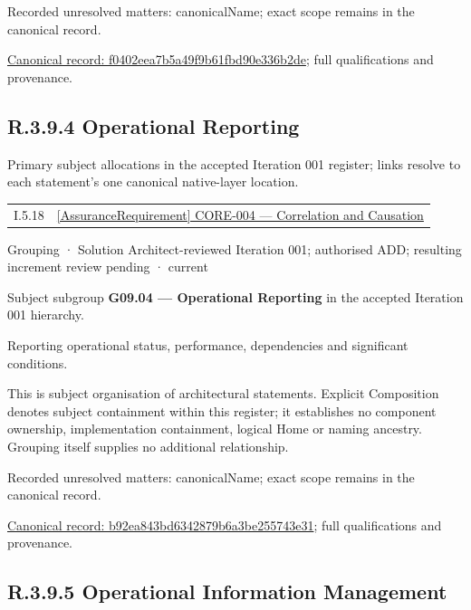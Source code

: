 {\small Recorded unresolved matters: canonicalName; exact scope remains in the canonical record.}\par
{\footnotesize \href{../../../../continuum/grouping/f0402eea7b5a49f9b61fbd90e336b2de.md}{Canonical record: f0402eea7b5a49f9b61fbd90e336b2de}; full qualifications and provenance.}\par
\subsection*{R.3.9.4 Operational Reporting}
\label{navigation:R.3.9.4}

Primary subject allocations in the accepted Iteration 001 register; links resolve to each statement’s one canonical native-layer location.\par
\begin{longtable}{p{.22\linewidth}p{.73\linewidth}}
I.5.18 & \hyperref[element:f2e504e7d6374e41a81303265adda6de]{[AssuranceRequirement] CORE-004 — Correlation and Causation} \\
\end{longtable}
\label{element:b92ea843bd6342879b6a3be255743e31}
{\small Grouping · Solution Architect-reviewed Iteration 001; authorised ADD; resulting increment review pending · current}\par

Subject subgroup \textbf{G09.04 — Operational Reporting} in the accepted Iteration 001 hierarchy.



Reporting operational status, performance, dependencies and significant conditions.



This is subject organisation of architectural statements. Explicit Composition denotes subject containment within this register; it establishes no component ownership, implementation containment, logical Home or naming ancestry. Grouping itself supplies no additional relationship.


{\small Recorded unresolved matters: canonicalName; exact scope remains in the canonical record.}\par
{\footnotesize \href{../../../../continuum/grouping/b92ea843bd6342879b6a3be255743e31.md}{Canonical record: b92ea843bd6342879b6a3be255743e31}; full qualifications and provenance.}\par
\subsection*{R.3.9.5 Operational Information Management}
\label{navigation:R.3.9.5}

